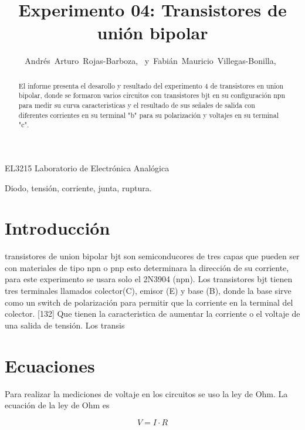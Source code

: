 \documentclass[journal]{IEEEtran}
\begin{document}
\title{Experimento 04: Transistores de unión bipolar}


\author{Andrés~Arturo~Rojas-Barboza,~
        y~Fabián~Mauricio~Villegas-Bonilla,~
}


%
{EL3215 Laboratorio de Electrónica Analógica}


\maketitle


\begin{abstract}
El informe presenta el desarollo y resultado del experimento 4 de transistores en union bipolar, donde se formaron varios circuitos con transistores bjt en su configuración npn para medir su curva caracteristicas y el resultado de sus señales de salida con diferentes corrientes en su terminal "b" para su polarización y voltajes en su terminal "c".
\end{abstract}

\begin{IEEEkeywords}
Diodo, tensión, corriente, junta, ruptura.
\end{IEEEkeywords}


\section{Introducción}

 transistores de union bipolar bjt son semiconducores de tres capas que pueden ser con materiales de tipo npn o pnp esto determinara la dirección de su corriente, para este experimento se usara solo el 2N3904 (npn). Los transistores bjt tienen tres terminales llamados colector(C), emisor (E) y base (B), donde la base sirve como un switch de polarización para permitir que la corriente en la terminal del colector. [132]
Que tienen la caracteristica de aumentar la corriente o el voltaje de una salida de tensión. Los transis


\section{Ecuaciones}
Para realizar la mediciones de voltaje en los circuitos se uso la ley de Ohm. La ecuación de la ley de Ohm es
\par
\begin{equation}
V=I\cdot R
\end{equation}
\end{document}
